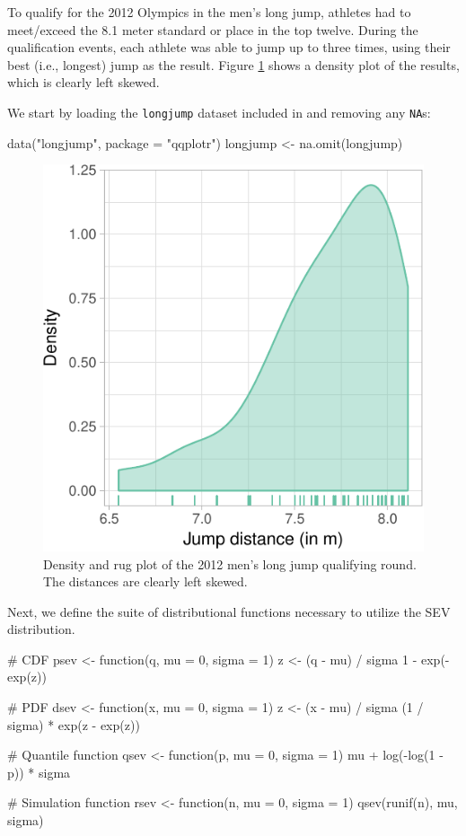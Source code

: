 To qualify for the 2012 Olympics in the men's long jump, athletes had to
meet/exceed the 8.1 meter standard or place in the top twelve. During
the qualification events, each athlete was able to jump up to three
times, using their best (i.e., longest) jump as the result. Figure
\ref{fig:jump-density} shows a density plot of the results, which is
clearly left skewed.

We start by loading the \texttt{longjump} dataset included in
 and removing any \texttt{NA}s:

\begin{Schunk}
\begin{Sinput}
data("longjump", package = "qqplotr")
longjump <- na.omit(longjump)
\end{Sinput}
\end{Schunk}

\begin{Schunk}
\begin{figure}

{\centering \includegraphics[width=0.45\linewidth]{loy-figures/jump-density-1} 

}

\caption[Density and rug plot of the 2012 men's long jump qualifying round]{Density and rug plot of the 2012 men's long jump qualifying round. The distances are clearly left skewed.}\label{fig:jump-density}
\end{figure}
\end{Schunk}

Next, we define the suite of distributional functions necessary to
utilize the SEV distribution.

\begin{Schunk}
\begin{Sinput}
# CDF
psev <- function(q, mu = 0, sigma = 1) {
  z <- (q - mu) / sigma
  1 - exp(-exp(z))
}

# PDF
dsev <- function(x, mu = 0, sigma = 1) {
  z <- (x - mu) / sigma
  (1 / sigma) * exp(z - exp(z))
}

# Quantile function
qsev <- function(p, mu = 0, sigma = 1) {
  mu + log(-log(1 - p)) * sigma
}

# Simulation function
rsev <- function(n, mu = 0, sigma = 1) {
  qsev(runif(n), mu, sigma)
}
\end{Sinput}
\end{Schunk}

